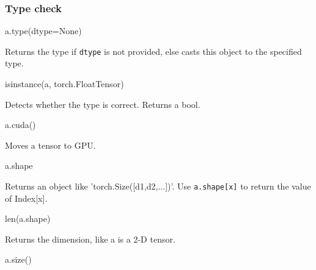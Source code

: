 \documentclass[
]{article}
\newenvironment{Shaded}{}{}
\newcommand{\BuiltInTok}[1]{#1}
\newcommand{\NormalTok}[1]{#1}
\newcommand{\OperatorTok}[1]{\textcolor[rgb]{0.40,0.40,0.40}{#1}}
\newcommand{\VariableTok}[1]{\textcolor[rgb]{0.10,0.09,0.49}{#1}}
\begin{document}
\hypertarget{header-n978}{%
\subsubsection{Type check}\label{header-n978}}

\begin{Shaded}
\begin{Highlighting}[]
\NormalTok{a.}\BuiltInTok{type}\NormalTok{(dtype}\OperatorTok{=}\VariableTok{None}\NormalTok{) }
\end{Highlighting}
\end{Shaded}

Returns the type if \texttt{dtype} is not provided, else casts this
object to the specified type.

\begin{Shaded}
\begin{Highlighting}[]
\BuiltInTok{isinstance}\NormalTok{(a, torch.FloatTensor)}
\end{Highlighting}
\end{Shaded}

Detects whether the type is correct. Returns a bool.

\begin{Shaded}
\begin{Highlighting}[]
\NormalTok{a.cuda()}
\end{Highlighting}
\end{Shaded}

Moves a tensor to GPU.

\begin{Shaded}
\begin{Highlighting}[]
\NormalTok{a.shape}
\end{Highlighting}
\end{Shaded}

Returns an object like 'torch.Size({[}d1,d2,...{]})'. Use
\texttt{a.shape{[}x{]}} to return the value of Index{[}x{]}.

\begin{Shaded}
\begin{Highlighting}[]
\BuiltInTok{len}\NormalTok{(a.shape)}
\end{Highlighting}
\end{Shaded}

Returns the dimension, like a is a 2-D tensor.

\begin{Shaded}
\begin{Highlighting}[]
\NormalTok{a.size()}
\end{Highlighting}
\end{Shaded}
\end{document}
